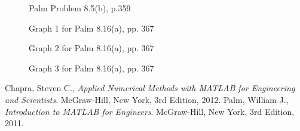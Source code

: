 \documentclass{article}
\begin{document}
\begin{figure}[htb!]
\begin{center}
\caption{Palm Problem 8.5(b), p.359}
\end{center}
\end{figure}


\begin{figure}[htb!]
\begin{center}
\caption{Graph 1 for Palm 8.16(a), pp. 367}
\end{center}
\end{figure}


\begin{figure}[htb!]
\begin{center}
\caption{Graph 2 for Palm 8.16(a), pp. 367}
\end{center}
\end{figure}


\begin{figure}[htb!]
\begin{center}
\caption{Graph 3 for Palm 8.16(a), pp. 367}
\end{center}
\end{figure}

\clearpage
\begin{thebibliography}{9}
  Chapra, Steven C.,
  {\it Applied Numerical Methods with MATLAB for Engineering and Scientists}.
  McGraw-Hill, New York,
  3rd Edition,
  2012.
  Palm, William J.,
  {\it Introduction to MATLAB for Engineers}.
  McGraw-Hill, New York,
  3rd Edition,
  2011.
\end{thebibliography}
\end{document}
